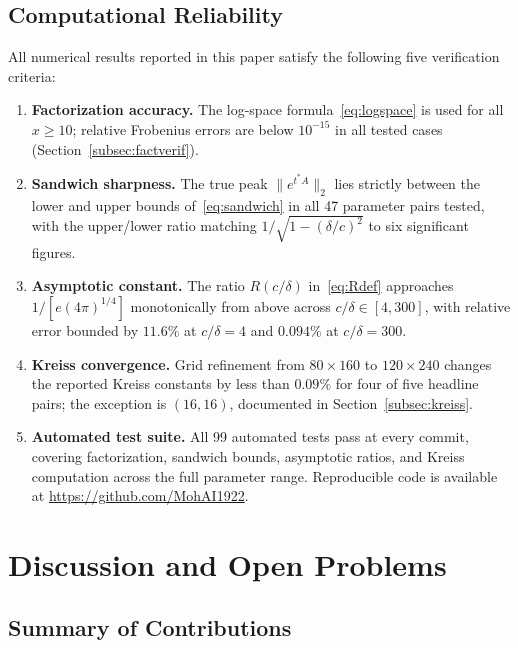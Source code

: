 \documentclass[11pt,reqno]{article}
\theoremstyle{plain}
\theoremstyle{definition}
\theoremstyle{remark}
\numberwithin{equation}{section}
\begin{document}
\subsection{Computational Reliability}\label{subsec:reliability}

All numerical results reported in this paper satisfy the following five verification criteria:
\begin{enumerate}[label=(\roman*)]
  \item \textbf{Factorization accuracy.} The log-space formula~\eqref{eq:logspace} is used for all $x \ge 10$; relative Frobenius errors are below $10^{-15}$ in all tested cases (Section~\ref{subsec:factverif}).
  \item \textbf{Sandwich sharpness.} The true peak $\|e^{t^*A}\|_2$ lies strictly between the lower and upper bounds of~\eqref{eq:sandwich} in all 47 parameter pairs tested, with the upper/lower ratio matching $1/\sqrt{1-(\delta/c)^2}$ to six significant figures.
  \item \textbf{Asymptotic constant.} The ratio $R(c/\delta)$ in~\eqref{eq:Rdef} approaches $1/[e(4\pi)^{1/4}]$ monotonically from above across $c/\delta \in [4, 300]$, with relative error bounded by $11.6\%$ at $c/\delta = 4$ and $0.094\%$ at $c/\delta = 300$.
  \item \textbf{Kreiss convergence.} Grid refinement from $80\times160$ to $120\times240$ changes the reported Kreiss constants by less than $0.09\%$ for four of five headline pairs; the exception is $(16,16)$, documented in Section~\ref{subsec:kreiss}.
  \item \textbf{Automated test suite.} All 99 automated tests pass at every commit, covering factorization, sandwich bounds, asymptotic ratios, and Kreiss computation across the full parameter range. Reproducible code is available at \url{https://github.com/MohAI1922}.
\end{enumerate}

\section{Discussion and Open Problems}\label{sec:discussion}

\subsection{Summary of Contributions}\label{subsec:summary}
\end{document}
